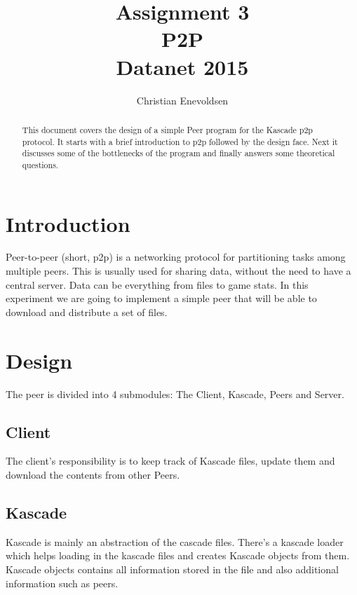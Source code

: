 \documentclass[a4paper,danish]{dnacm} %
\begin{document}

\title{Assignment 3 \\ P2P \\ Datanet 2015} %

\author{Christian Enevoldsen
}



\maketitle

\begin{abstract}

This document covers the design of a simple Peer program for the Kascade p2p protocol. It starts with a brief introduction to p2p followed by the design face. Next it discusses some of the bottlenecks of the program and finally answers some theoretical questions.

\end{abstract}

\section{Introduction}
Peer-to-peer (short, p2p) is a networking protocol for partitioning tasks among multiple peers. This is usually used for sharing data, without the need to have a central server. Data can be everything from files to game stats. In this experiment we are going to implement a simple peer that will be able to download and distribute a set of files.
 
\section{Design}

The peer is divided into 4 submodules: The Client, Kascade, Peers and Server.

\subsection {Client}
The client's responsibility is to keep track of Kascade files, update them and download the contents from other Peers.

\subsection{Kascade}
Kascade is mainly an abstraction of the cascade files. There's a kascade loader which helps loading in the kascade files and creates Kascade objects from them. Kascade objects contains all information stored in the file and also additional information such as peers.
\end{document}

